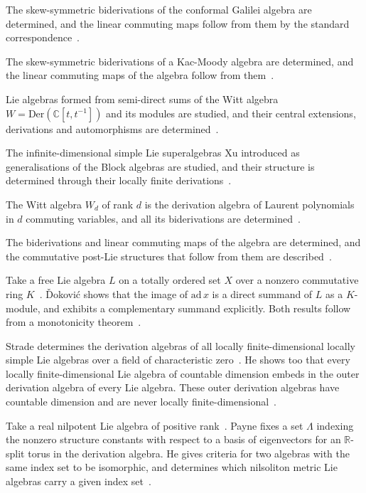The skew-symmetric biderivations of the conformal Galilei algebra are
determined, and the linear commuting maps follow from them by the standard
correspondence~\cite{WlSkew-symmetricBiderivation2023}.

The skew-symmetric biderivations of a Kac-Moody algebra are determined, and
the linear commuting maps of the algebra follow from
them~\cite{WlSkew-symmetricBiderivation2023}.

Lie algebras formed from semi-direct sums of the Witt algebra
$W=\mathrm{Der}(\mathbb{C}[t,t^{-1}])$ and its modules are studied, and their
central extensions, derivations and automorphisms are
determined~\cite{WlCentralExtensionsDerivationsAn2020}.

The infinite-dimensional simple Lie superalgebras Xu introduced as
generalisations of the Block algebras are studied, and their structure is
determined through their locally finite
derivations~\cite{WlStructureOfLieSuperalgebrasOfB2019}.

The Witt algebra $W_d$ of rank $d$ is the derivation algebra of Laurent
polynomials in $d$ commuting variables, and all its biderivations are
determined~\cite{WlBiderivationsOfTheHigherRankWi2019}.

The biderivations and linear commuting maps of the algebra are determined, and
the commutative post-Lie structures that follow from them are
described~\cite{WlBiderivationsLinearCommutingMa2019}.

Take a free Lie algebra $L$ on a totally ordered set $X$ over a nonzero
commutative ring $K$~\cite{WlOnSomeInnerDerivationsOfFreeLi1988}. \v{D}okovi\'c shows that the image of $\mathrm{ad}\,x$
is a direct summand of $L$ as a $K$-module, and exhibits a complementary
summand explicitly. Both results follow from a monotonicity
theorem~\cite{WlOnSomeInnerDerivationsOfFreeLi1988}.

Strade determines the derivation algebras of all locally finite-dimensional
locally simple Lie algebras over a field of characteristic zero~\cite{WlLocallyFiniteDimensionalLieAlg1999}. He shows
too that every locally finite-dimensional Lie algebra of countable dimension
embeds in the outer derivation algebra of every Lie algebra. These outer
derivation algebras have countable dimension and are never locally
finite-dimensional~\cite{WlLocallyFiniteDimensionalLieAlg1999}.

Take a real nilpotent Lie algebra of positive rank~\cite{WlApplicationsOfIndexSetsAndNiko2014}. Payne fixes a set
$\Lambda$
indexing the nonzero structure constants with respect to a basis of
eigenvectors for an $\mathbb{R}$-split torus in the derivation algebra. He %
gives
criteria for two algebras with the same index set to be isomorphic, and
determines which nilsoliton metric Lie algebras carry a given index
set~\cite{WlApplicationsOfIndexSetsAndNiko2014}.


